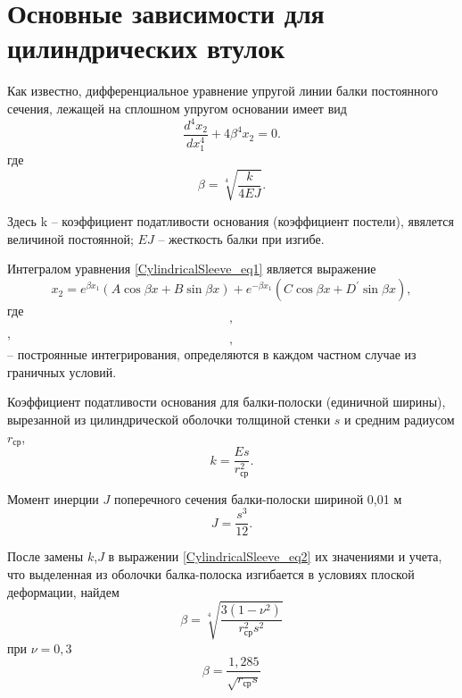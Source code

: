 \section{Основные зависимости для цилиндрических втулок}
\label{CylindricalSleeve}

Как известно, дифференциальное уравнение упругой линии балки постоянного сечения, лежащей на сплошном упругом основании имеет вид
\begin{equation}
  \label{CylindricalSleeve_eq1}
  \frac{d^4 x_2}{dx_1^4} +4 {\beta}^4 x_2=0.  
\end{equation}
где 
\begin{equation}
  \label{CylindricalSleeve_eq2}
  \beta=\sqrt[4]{\frac{k}{4EJ}}.  
\end{equation}

Здесь {k} -- коэффициент податливости основания (коэффициент постели), явялется величиной постоянной; $EJ$ -- жесткость балки при изгибе.

Интегралом уравнения \eqref{CylindricalSleeve_eq1} является выражение 
\begin{equation}
  \label{CylindricalSleeve_eq3}
  x_2=e^{\beta x_1} \left( A \cos{\beta x} +B \sin {\beta x} \right)+ e^{-\beta x_1} \left( C \cos{\beta x} +D^{\prime} \sin {\beta x} \right),  
\end{equation}
где $$,$$,$$,$$ -- построянные интегрирования, определяются в каждом частном случае из граничных условий.

Коэффициент податливости основания для балки-полоски (единичной ширины), вырезанной из цилиндрической оболочки толщиной стенки $s$ и средним радиусом $r_{\text{ср}}$,
\begin{equation}
  \label{CylindricalSleeve_eq4}
  k=\frac{Es}{r_{\text{ср}}^2}.  
\end{equation}

Момент инерции $J$ поперечного сечения балки-полоски шириной 0,01 м 
\begin{equation*}
  J=\frac{s^3}{12}.  
\end{equation*}

После замены ${k}$,${J}$ в выражении \eqref{CylindricalSleeve_eq2} их значениями и учета, что выделенная из оболочки балка-полоска изгибается в условиях плоской деформации, найдем
\begin{equation}
  \label{CylindricalSleeve_eq5}
  \beta=\sqrt[4]{\frac{3 \left( 1-{\nu}^2 \right)}{r_{\text{ср}}^2 s^2}} 
\end{equation}
при $\nu=0,3$ 
\begin{equation}
  \label{CylindricalSleeve_eq6}
  \beta=\frac{1,285}{\sqrt{r_{\text{ср}} s}} 
\end{equation}


